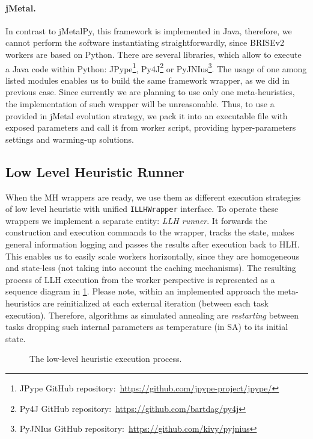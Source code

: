\paragraph{jMetal.} In contrast to jMetalPy, this framework is implemented in Java, therefore, we cannot perform the software instantiating straightforwardly, since BRISEv2 workers are based on Python. There are several libraries, which allow to execute a Java code within Python: JPype\footnote{JPype GitHub repository:~\url{https://github.com/jpype-project/jpype/}}, Py4J\footnote{Py4J GitHub repository:~\url{https://github.com/bartdag/py4j}} or PyJNIus\footnote{PyJNIus GitHub repository:~\url{https://github.com/kivy/pyjnius}}. The usage of one among listed modules enables us to build the same framework wrapper, as we did in previous case. Since currently we are planning to use only one meta-heuristics, the implementation of such wrapper will be unreasonable. Thus, to use a provided in jMetal evolution strategy, we pack it into an executable file with exposed parameters and call it from worker script, providing hyper-parameters settings and warming-up solutions.

\subsection{Low Level Heuristic Runner}
When the MH wrappers are ready, we use them as different execution strategies of low level heuristic with unified \texttt{ILLHWrapper} interface. To operate these wrappers we implement a separate entity: \emph{LLH runner}. It forwards the construction and execution commands to the wrapper, tracks the state, makes general information logging and passes the results after execution back to HLH. This enables us to easily scale workers horizontally, since they are homogeneous and state-less (not taking into account the caching mechanisms). The resulting process of LLH execution from the worker perspective is represented as a sequence diagram in \cref{impl:pict:llh sequence diagram}. Please note, within an implemented approach the meta-heuristics are reinitialized at each external iteration (between each task execution). Therefore, algorithms as simulated annealing are \emph{restarting} between tasks dropping such internal parameters as temperature (in SA) to its initial state.

\begin{figure}
	\centering
	
	\caption{The low-level heuristic execution process.}
	\label{impl:pict:llh sequence diagram}
\end{figure}

